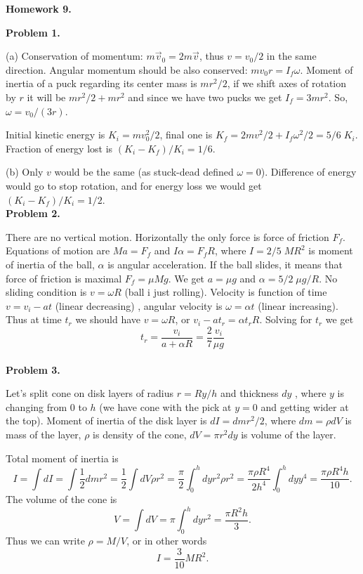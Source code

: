 \documentclass[12pt]{article}
\begin{document}
\begin{center}
{\bf\large Homework 9.}
\end{center}

{\bf Problem 1.}

(a) Conservation of momentum: $m\vec{v}_0 =2m \vec{v}$, thus $v=v_0/2$ in the same direction.
Angular momentum should be also conserved: $mv_0 r= I_f \omega$.
Moment of inertia of a puck regarding its center mass is $mr^2/2$, if we shift axes of rotation
by $r$ it will be $mr^2/2 +mr^2$ and since we have two pucks we get $I_f=3mr^2$.
So, $\omega=v_0/(3r)$.

Initial kinetic energy is $K_i=mv_0^2/2$, final one is $K_f=2m v^2/2 +I_f \omega^2/2=5/6 \;K_i$.
Fraction of energy lost is $(K_i-K_f)/K_i=1/6$.

(b) Only $v$ would be the same (as stuck-dead defined $\omega=0$). Difference of energy
would go to stop rotation, and for energy loss we would get $(K_i-K_f)/K_i=1/2$.
\\

{\bf Problem 2.}

There are no vertical motion. Horizontally the only force is force of friction $F_f$.
Equations of motion are $M a=F_f$ and $I \alpha =F_f R$, where $I=2/5\;MR^2$ is moment of
inertia of the ball, $\alpha$ is angular acceleration. If the ball slides, it means that force of friction
is maximal $F_f=\mu Mg$. We get $a=\mu g$ and $\alpha=5/2\;\mu g/R$. No sliding condition
is $v=\omega R$ (ball i just rolling). Velocity is function of time $v=v_i -at$ (linear decreasing) ,  angular velocity is $\omega=\alpha t$ (linear increasing). Thus at time $t_r$  we should have
$v=\omega R$, or $v_i -at_r=\alpha t_r R$. Solving for $t_r$ we get 
$$t_r=\frac{v_i}{a+\alpha R}=\frac{2}{7}\frac{v_i}{\mu g}$$
\\

{\bf Problem 3.}

Let's split cone on disk layers of radius $r=R y/h$ and thickness $dy$ , where $y$ is changing from $0$ to $h$ (we have cone with the pick at $y=0$ and getting wider at the top).
Moment of inertia of the disk layer is $dI=dm r^2/2$, where $dm=\rho dV$ is mass of the layer,
$\rho$ is density of the cone, $dV=\pi r^2 dy$ is volume of the layer. 

Total moment of inertia is
$$I=\int dI=\int \frac{1}{2}dm r^2= \frac{1}{2}\int dV \rho r^2= \frac{\pi}{2}\int_{0}^{h} dy r^2 \rho r^2=
 \frac{\pi \rho R^4}{2 h^4}\int_{0}^{h} dy y^4= \frac{\pi \rho R^4 h}{10}.$$
The volume of the cone is 
$$V=\int dV = \pi \int_{0}^{h} dy r^2 = \frac{\pi R^2 h}{3}.$$
Thus we can write $\rho=M/V$, or in other words 
$$I=\frac{3}{10}MR^2.$$
\\
\\
\end{document}

